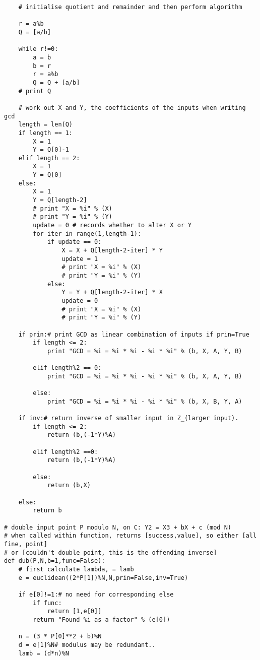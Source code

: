 \begin{verbatim}
    # initialise quotient and remainder and then perform algorithm

    r = a%b
    Q = [a/b]

    while r!=0:
        a = b
        b = r
        r = a%b
        Q = Q + [a/b]
    # print Q

    # work out X and Y, the coefficients of the inputs when writing gcd
    length = len(Q)
    if length == 1:
        X = 1
        Y = Q[0]-1
    elif length == 2:
        X = 1
        Y = Q[0]
    else:
        X = 1
        Y = Q[length-2]
        # print "X = %i" % (X)
        # print "Y = %i" % (Y)
        update = 0 # records whether to alter X or Y
        for iter in range(1,length-1):
            if update == 0:
                X = X + Q[length-2-iter] * Y
                update = 1
                # print "X = %i" % (X)
                # print "Y = %i" % (Y)
            else:
                Y = Y + Q[length-2-iter] * X
                update = 0
                # print "X = %i" % (X)
                # print "Y = %i" % (Y)

    if prin:# print GCD as linear combination of inputs if prin=True
        if length <= 2:
            print "GCD = %i = %i * %i - %i * %i" % (b, X, A, Y, B)

        elif length%2 == 0:
            print "GCD = %i = %i * %i - %i * %i" % (b, X, A, Y, B)

        else:
            print "GCD = %i = %i * %i - %i * %i" % (b, X, B, Y, A)

    if inv:# return inverse of smaller input in Z_(larger input).
        if length <= 2:
            return (b,(-1*Y)%A)

        elif length%2 ==0:
            return (b,(-1*Y)%A)

        else:
            return (b,X)

    else:
        return b

# double input point P modulo N, on C: Y2 = X3 + bX + c (mod N)
# when called within function, returns [success,value], so either [all fine, point]
# or [couldn't double point, this is the offending inverse]
def dub(P,N,b=1,func=False):
    # first calculate lambda, = lamb
    e = euclidean((2*P[1])%N,N,prin=False,inv=True)

    if e[0]!=1:# no need for corresponding else
        if func:
            return [1,e[0]]
        return "Found %i as a factor" % (e[0])

    n = (3 * P[0]**2 + b)%N
    d = e[1]%N# modulus may be redundant..
    lamb = (d*n)%N


\end{verbatim}
